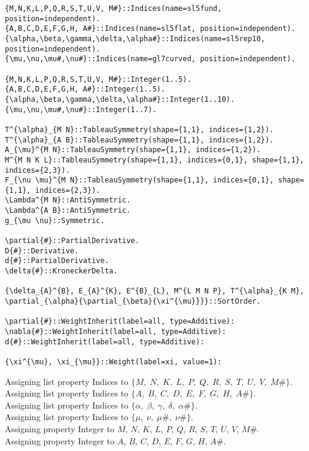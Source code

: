 \documentclass[11pt]{article}
\begin{document}
{\color[named]{Blue}\begin{verbatim}
{M,N,K,L,P,Q,R,S,T,U,V, M#}::Indices(name=sl5fund, position=independent).
{A,B,C,D,E,F,G,H, A#}::Indices(name=sl5flat, position=independent).
{\alpha,\beta,\gamma,\delta,\alpha#}::Indices(name=sl5rep10, position=independent).
{\mu,\nu,\mu#,\nu#}::Indices(name=gl7curved, position=independent).

{M,N,K,L,P,Q,R,S,T,U,V, M#}::Integer(1..5).
{A,B,C,D,E,F,G,H, A#}::Integer(1..5).
{\alpha,\beta,\gamma,\delta,\alpha#}::Integer(1..10).
{\mu,\nu,\mu#,\nu#}::Integer(1..7).

T^{\alpha}_{M N}::TableauSymmetry(shape={1,1}, indices={1,2}).
T^{\alpha}_{A B}::TableauSymmetry(shape={1,1}, indices={1,2}).
A_{\mu}^{M N}::TableauSymmetry(shape={1,1}, indices={1,2}).
M^{M N K L}::TableauSymmetry(shape={1,1}, indices={0,1}, shape={1,1}, indices={2,3}).
F_{\nu \mu}^{M N}::TableauSymmetry(shape={1,1}, indices={0,1}, shape={1,1}, indices={2,3}).
\Lambda^{M N}::AntiSymmetric.
\Lambda^{A B}::AntiSymmetric.
g_{\mu \nu}::Symmetric.

\partial{#}::PartialDerivative.
D{#}::Derivative.
d{#}::PartialDerivative.
\delta{#}::KroneckerDelta.

{\delta_{A}^{B}, E_{A}^{K}, E^{B}_{L}, M^{L M N P}, T^{\alpha}_{K M},  \partial_{\alpha}{\partial_{\beta}{\xi^{\mu}}}}::SortOrder.

\partial{#}::WeightInherit(label=all, type=Additive):
\nabla{#}::WeightInherit(label=all, type=Additive):
d{#}::WeightInherit(label=all, type=Additive):

{\xi^{\mu}, \xi_{\mu}}::Weight(label=xi, value=1):
\end{verbatim}}
Assigning list property Indices to $\{M,\; N,\; K,\; L,\; P,\; Q,\; R,\; S,\; T,\; U,\; V,\; M\#\}$.
\\
Assigning list property Indices to $\{A,\; B,\; C,\; D,\; E,\; F,\; G,\; H,\; A\#\}$.
\\
Assigning list property Indices to $\{\alpha,\; \beta,\; \gamma,\; \delta,\; \alpha\#\}$.
\\
Assigning list property Indices to $\{\mu,\; \nu,\; \mu\#,\; \nu\#\}$.
\\
Assigning property Integer to $M$, $N$, $K$, $L$, $P$, $Q$, $R$, $S$, $T$, $U$, $V$, $M\#$.
\\
Assigning property Integer to $A$, $B$, $C$, $D$, $E$, $F$, $G$, $H$, $A\#$.
\end{document}
